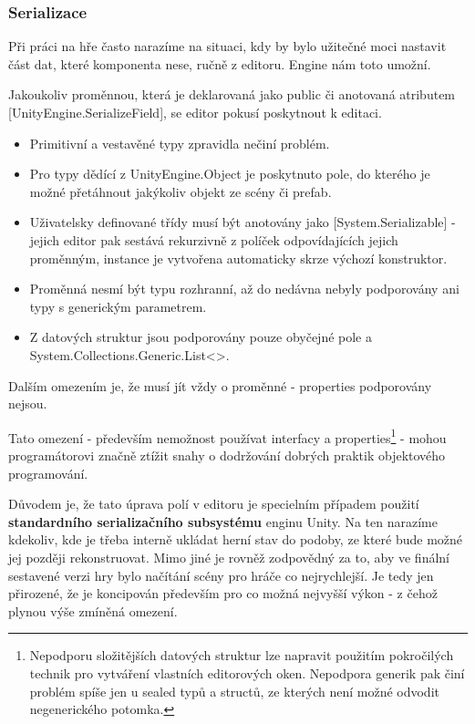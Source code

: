 \subsubsection*{Serializace}

Při práci na hře často narazíme na situaci, kdy by bylo užitečné moci nastavit část dat, které komponenta nese, ručně z editoru. Engine nám toto umožní.

Jakoukoliv proměnnou, která je deklarovaná jako public či anotovaná atributem [UnityEngine.SerializeField], se editor pokusí poskytnout k editaci.
\begin{itemize}
    \item Primitivní a vestavěné typy zpravidla nečiní problém.
    \item Pro typy dědící z UnityEngine.Object je poskytnuto pole, do kterého je možné přetáhnout jakýkoliv objekt ze scény či prefab.
    \item Uživatelsky definované třídy musí být anotovány jako [System.Serializable] - jejich editor pak sestává rekurzivně z políček odpovídajících jejich proměnným, instance je vytvořena automaticky skrze výchozí konstruktor.
    \item Proměnná nesmí být typu rozhranní, až do nedávna nebyly podporovány ani typy s generickým parametrem.
    \item Z datových struktur jsou podporovány pouze obyčejné pole a System.Collections.Generic.List<>.
\end{itemize}
Dalším omezením je, že musí jít vždy o proměnné - properties podporovány nejsou.

Tato omezení - především nemožnost používat interfacy a properties\footnote{Nepodporu složitějších datových struktur lze napravit použitím pokročilých technik pro vytváření vlastních editorových oken. Nepodpora generik pak činí problém spíše jen u sealed typů a structů, ze kterých není možné odvodit negenerického potomka.} - mohou programátorovi značně ztížit snahy o dodržování dobrých praktik objektového programování.

Důvodem je, že tato úprava polí v editoru je specielním případem použití \textbf{standardního serializačního subsystému} enginu Unity. Na ten narazíme kdekoliv, kde je třeba interně ukládat herní stav do podoby, ze které bude možné jej později rekonstruovat. Mimo jiné je rovněž zodpovědný za to, aby ve finální sestavené verzi hry bylo načítání scény pro hráče co nejrychlejší. Je tedy jen přirozené, že je koncipován především pro co možná nejvyšší výkon - z čehož plynou výše zmíněná omezení.

